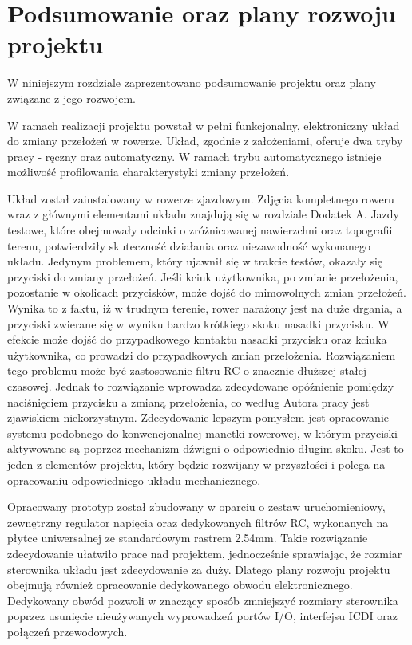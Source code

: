 \chapter{Podsumowanie oraz plany rozwoju projektu}

W niniejszym rozdziale zaprezentowano podsumowanie projektu oraz plany związane z jego rozwojem. 

W ramach realizacji projektu powstał w pełni funkcjonalny, elektroniczny układ do zmiany przełożeń w rowerze. Układ, zgodnie z założeniami, oferuje dwa tryby pracy - ręczny oraz automatyczny. W ramach trybu automatycznego istnieje możliwość profilowania charakterystyki zmiany przełożeń.

Układ został zainstalowany w rowerze zjazdowym. Zdjęcia kompletnego roweru wraz z głównymi elementami układu znajdują się w rozdziale Dodatek A. Jazdy testowe, które obejmowały odcinki o zróżnicowanej nawierzchni oraz topografii terenu, potwierdziły skuteczność działania oraz niezawodność wykonanego układu. Jedynym problemem, który ujawnił się w trakcie testów, okazały się przyciski do zmiany przełożeń. Jeśli kciuk użytkownika, po zmianie przełożenia, pozostanie w okolicach przycisków, może dojść do mimowolnych zmian przełożeń. Wynika to z faktu, iż w trudnym terenie, rower narażony jest na duże drgania, a przyciski zwierane się w wyniku bardzo krótkiego skoku nasadki przycisku. W efekcie może dojść do przypadkowego kontaktu nasadki przycisku oraz kciuka użytkownika, co prowadzi do przypadkowych zmian przełożenia. Rozwiązaniem tego problemu może być zastosowanie filtru RC o znacznie dłuższej stałej czasowej. Jednak to rozwiązanie wprowadza zdecydowane opóźnienie pomiędzy naciśnięciem przycisku a zmianą przełożenia, co według Autora pracy jest zjawiskiem niekorzystnym. Zdecydowanie lepszym pomysłem jest opracowanie systemu podobnego do konwencjonalnej manetki rowerowej, w którym przyciski aktywowane są poprzez mechanizm dźwigni o odpowiednio długim skoku. Jest to jeden z elementów projektu, który będzie rozwijany w przyszłości i polega na opracowaniu odpowiedniego układu mechanicznego.

Opracowany prototyp został zbudowany w oparciu o zestaw uruchomieniowy, zewnętrzny regulator napięcia oraz dedykowanych filtrów RC, wykonanych na płytce uniwersalnej ze standardowym rastrem 2.54mm. Takie rozwiązanie zdecydowanie ułatwiło prace nad projektem, jednocześnie sprawiając, że rozmiar sterownika układu jest zdecydowanie za duży. Dlatego plany rozwoju projektu obejmują również opracowanie dedykowanego obwodu elektronicznego. Dedykowany obwód pozwoli w znaczący sposób zmniejszyć rozmiary sterownika poprzez usunięcie nieużywanych wyprowadzeń portów I/O, interfejsu ICDI oraz połączeń przewodowych.

